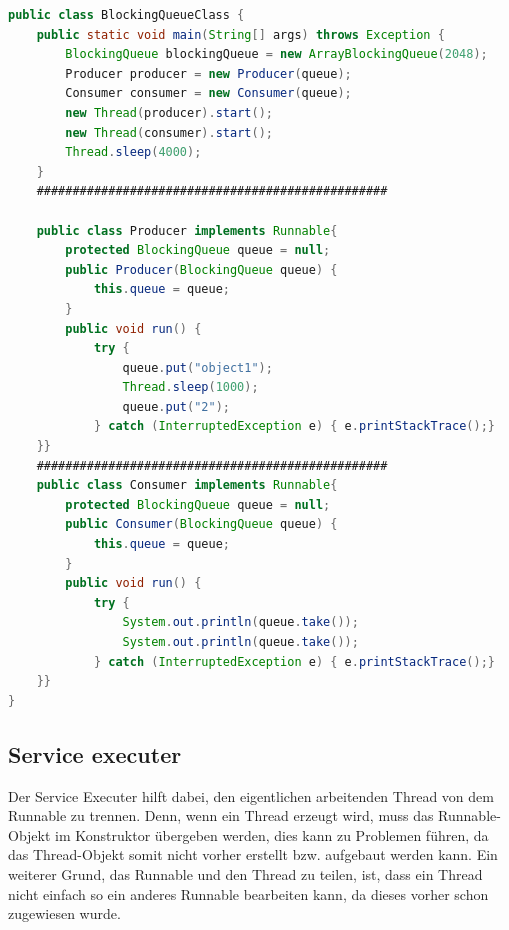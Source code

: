 \begin{lstlisting}[language=java,caption=Java BlockingQueue Beispiel,label=lst:impl:blockingQueue]
    public class BlockingQueueClass {
    public static void main(String[] args) throws Exception {
        BlockingQueue blockingQueue = new ArrayBlockingQueue(2048);
        Producer producer = new Producer(queue);
        Consumer consumer = new Consumer(queue);
        new Thread(producer).start();
        new Thread(consumer).start();
        Thread.sleep(4000);
    }
    #################################################
 
    public class Producer implements Runnable{
        protected BlockingQueue queue = null;
        public Producer(BlockingQueue queue) {
            this.queue = queue;
        }
        public void run() {
            try {
                queue.put("object1");
                Thread.sleep(1000);
                queue.put("2");
            } catch (InterruptedException e) { e.printStackTrace();}
    }}
    #################################################
    public class Consumer implements Runnable{
        protected BlockingQueue queue = null;
        public Consumer(BlockingQueue queue) {
            this.queue = queue;
        }
        public void run() {
            try {
                System.out.println(queue.take());
                System.out.println(queue.take());
            } catch (InterruptedException e) { e.printStackTrace();}
    }}
}
\end{lstlisting}
 
\subsection{Service executer}
Der Service Executer hilft dabei, den eigentlichen arbeitenden Thread von dem Runnable zu trennen. Denn, wenn ein Thread erzeugt wird, muss das Runnable-Objekt im Konstruktor übergeben werden, dies kann zu Problemen führen, da das Thread-Objekt somit nicht vorher erstellt bzw. aufgebaut werden kann. Ein weiterer Grund, das Runnable und den Thread zu teilen, ist, dass ein Thread nicht einfach so ein anderes Runnable bearbeiten kann, da dieses vorher schon zugewiesen wurde.
 
 
 
 
